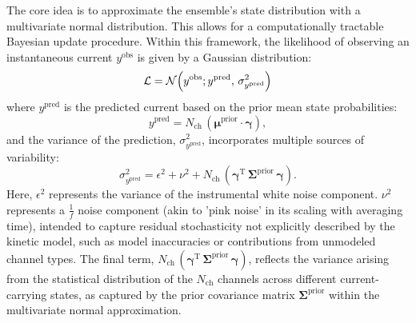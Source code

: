 \documentclass[9pt]{elife}
\begin{document}
	The core idea is to approximate the ensemble's state distribution with a multivariate normal distribution. This allows for a computationally tractable Bayesian update procedure. Within this framework, the likelihood of observing an instantaneous current \( y^{\text{obs}} \) is given by a Gaussian distribution:
	\begin{equation}
		\mathcal{L} = \mathcal{N}\Bigl( y^{\text{obs}} ; y^{\text{pred}},\, \sigma^2_{y^{\text{pred}}} \Bigr)
		\label{eq:macro_likelihood}
	\end{equation}
	where \( y^{\text{pred}} \) is the predicted current based on the prior mean state probabilities:
	\begin{equation}
		y^{\text{pred}} = N_{\text{ch}}\, (\boldsymbol{\mu}^{\text{prior}} \cdot \boldsymbol{\gamma}),
		\label{eq:macro_predicted_y} %
	\end{equation}
	and the variance of the prediction, \( \sigma^2_{y^{\text{pred}}} \), incorporates multiple sources of variability:
	\begin{equation}
		\sigma^2_{y^{\text{pred}}} = \epsilon^2 + \nu^2 + N_{\text{ch}}\, (\boldsymbol{\gamma}^{\mathrm{T}}\, \boldsymbol{\Sigma}^{\text{prior}}\, \boldsymbol{\gamma}).
		\label{eq:macro_sigma_pred} %
	\end{equation}
	Here, \(\epsilon^2\) represents the variance of the instrumental white noise component. \(\nu^2\) represents a $\frac{1}{f}$ noise component (akin to 'pink noise' in its scaling with averaging time), intended to capture residual stochasticity not explicitly described by the kinetic model, such as model inaccuracies or contributions from unmodeled channel types. The final term, \( N_{\text{ch}}\, (\boldsymbol{\gamma}^{\mathrm{T}}\, \boldsymbol{\Sigma}^{\text{prior}}\, \boldsymbol{\gamma}) \), reflects the variance arising from the statistical distribution of the \(N_{\text{ch}}\) channels across different current-carrying states, as captured by the prior covariance matrix \( \boldsymbol{\Sigma}^{\text{prior}} \) within the multivariate normal approximation.
	
\end{document}
